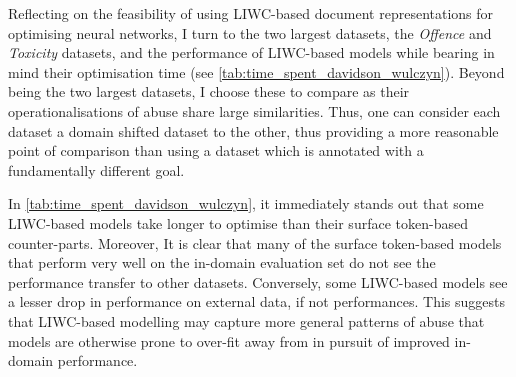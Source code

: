 Reflecting on the feasibility of using LIWC-based document representations for optimising neural networks, I turn to the two largest datasets, the \textit{Offence} and \textit{Toxicity} datasets, and the performance of LIWC-based models while bearing in mind their optimisation time (see \cref{tab:time_spent_davidson_wulczyn}).
Beyond being the two largest datasets, I choose these to compare as their operationalisations of abuse share large similarities.
Thus, one can consider each dataset a domain shifted dataset to the other, thus providing a more reasonable point of comparison than using a dataset which is annotated with a fundamentally different goal.

In \cref{tab:time_spent_davidson_wulczyn}, it immediately stands out that some LIWC-based models take longer to optimise than their surface token-based counter-parts.
Moreover, It is clear that many of the surface token-based models that perform very well on the in-domain evaluation set do not see the performance transfer to other datasets.
Conversely, some LIWC-based models  see a lesser drop in performance on external data, if not   performances.
This suggests that LIWC-based modelling may capture more general patterns of abuse that models are otherwise prone to over-fit away from in pursuit of improved in-domain performance.

